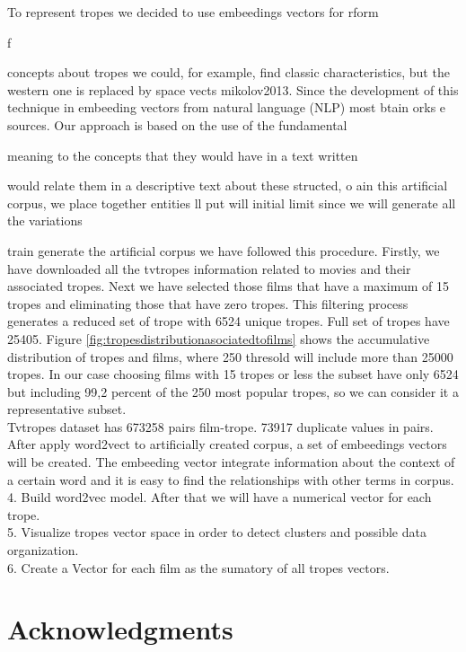 \documentclass[letterpaper]{article}
\begin{document}
	To represent tropes we decided to use embeedings vectors for
rform

f

        concepts about tropes we could, for example, find classic
characteristics, but the western one is replaced by space
vects
{mikolov2013}. Since the development of this technique in
        embeeding vectors from natural language (NLP) most
btain
orks
e
 sources. Our approach is based on the use of the fundamental

       meaning to the concepts that they would have in a text written

       would relate them in a descriptive text about these
structed,
o
ain this artificial corpus, we place together entities
ll
put
will
       initial limit since we will generate all the variations

train
generate the artificial corpus we have followed this procedure. Firstly, we have downloaded all the tvtropes information related to movies and their associated tropes. Next we have selected those films that have a maximum of 15 tropes and eliminating those that have zero tropes. This filtering process generates a reduced set of trope with 6524 unique tropes. Full set of tropes have 25405. Figure  \ref{fig:tropesdistributionasociatedtofilms} shows the accumulative distribution of tropes and films, where 250 thresold will include more than 25000 tropes. In our case choosing films with 15 tropes or less the subset have only 6524 but including 99,2 percent of the 250 most popular tropes, so we can consider it a representative subset.\\
 Tvtropes dataset has 673258 pairs film-trope. 73917 duplicate values in pairs. After apply word2vect to artificially created corpus, a set of embeedings vectors will be created. The embeeding vector integrate information about the context of a certain word and it is easy to find the relationships with other terms in corpus.\\


	4. Build word2vec model. After that we will have a numerical vector for each trope. \\
	5. Visualize tropes vector space in order to detect clusters and possible data organization. \\ 
	6. Create a Vector for each film as the sumatory of all tropes vectors. \\
	
	\section{Acknowledgments}
	
	
	
	
\end{document}

